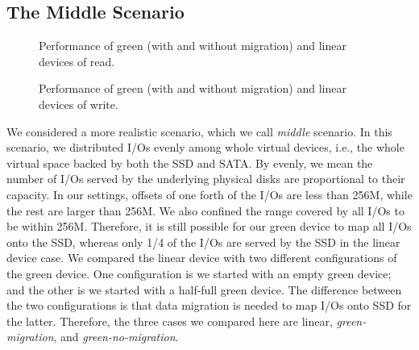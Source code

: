 \subsection{The Middle Scenario}

\begin{figure}[t]
\begin{centering}
\caption{Performance of green (with and without migration) and linear
devices of read.}
\label{fig:evenread}
\end{centering}
\end{figure}

\begin{figure}[t]
\begin{centering}
\caption{Performance of green (with and without migration) and linear
devices of write.}
\label{fig:evenwrite}
\end{centering}
\end{figure}

We considered a more realistic scenario, which we call \textit{middle}
scenario. In this scenario, we distributed I/Os evenly among whole
virtual devices, i.e., the whole virtual space backed by both the SSD
and SATA.  By evenly, we mean the number of I/Os served by the
underlying physical disks are proportional to their capacity.  In our
settings, offsets of one forth of the I/Os are less than 256M, while
the rest are larger than 256M.  We also confined the range covered by
all I/Os to be within 256M.  Therefore, it is still possible for our
green device to map all I/Os onto the SSD, whereas only 1/4 of the
I/Os are served by the SSD in the linear device case.  We compared the
linear device with two different configurations of the green device.
One configuration is we started with an empty green device; and the
other is we started with a half-full green device. The difference
between the two configurations is that data migration is needed to map
I/Os onto SSD for the latter. Therefore, the three cases we compared
here are linear, \textit{green-migration}, and
\textit{green-no-migration}.

